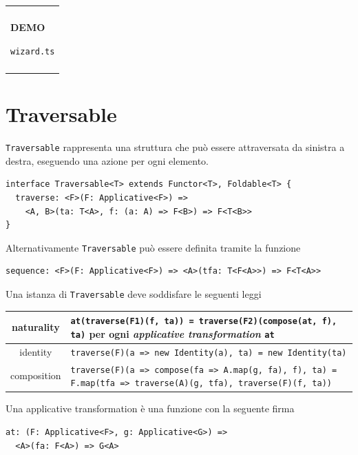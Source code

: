 \documentclass[12pt]{article}
\newenvironment{demo}
    {\begin{center}
    \begin{tabular}{|p{0.9\textwidth}|}
    \hline\\
    }
    {
    \\\\\hline
    \end{tabular}
    \end{center}
    }
\begin{document}
\begin{demo}
\begin{center}
\textbf{DEMO}

\texttt{wizard.ts}
\end{center}
\end{demo}

\newpage

\section{Traversable}

\texttt{Traversable} rappresenta una struttura che può essere attraversata da sinistra a destra, eseguendo una azione per ogni elemento.

\begin{verbatim}
interface Traversable<T> extends Functor<T>, Foldable<T> {
  traverse: <F>(F: Applicative<F>) =>
    <A, B>(ta: T<A>, f: (a: A) => F<B>) => F<T<B>>
}
\end{verbatim}

Alternativamente \texttt{Traversable} può essere definita tramite la funzione

\begin{verbatim}
sequence: <F>(F: Applicative<F>) => <A>(tfa: T<F<A>>) => F<T<A>>
\end{verbatim}

Una istanza di \texttt{Traversable} deve soddisfare le seguenti leggi

\begin{center}
\bgroup
\def\arraystretch{1.5}
\begin{tabular}{ |c|p{10cm}| }
\hline
naturality & \texttt{at(traverse(F1)(f, ta)) = traverse(F2)(compose(at, f), ta)} per ogni \emph{applicative transformation} \texttt{at} \\
\hline
identity & \texttt{traverse(F)(a => new Identity(a), ta) = new Identity(ta)} \\
\hline
composition & \texttt{traverse(F)(a => compose(fa => A.map(g, fa), f), ta) = F.map(tfa => traverse(A)(g, tfa), traverse(F)(f, ta))} \\
\hline
\end{tabular}
\egroup
\end{center}

Una applicative transformation è una funzione con la seguente firma

\begin{verbatim}
at: (F: Applicative<F>, g: Applicative<G>) =>
  <A>(fa: F<A>) => G<A>
\end{verbatim}
\end{document}
